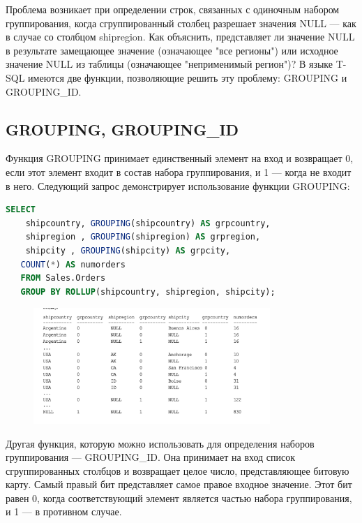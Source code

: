 Проблема возникает при определении строк,
связанных с одиночным набором группирования, когда сгруппированный столбец
разрешает значения NULL — как в случае со столбцом shipregion. Как объяснить,
представляет ли значение NULL в результате замещающее значение (означающее
"все регионы") или исходное значение NULL из таблицы (означающее "неприменимый регион")? В языке T-SQL имеются две функции, позволяющие решить эту
проблему: GROUPING и GROUPING\_ID. 

\subsection{GROUPING, GROUPING\_ID}

Функция GROUPING принимает единственный элемент на вход и возвращает 0, если
этот элемент входит в состав набора группирования, и 1 — когда не входит в него.
Следующий запрос демонстрирует использование функции GROUPING: 

\begin{lstlisting}[label=lst:funcReturn, language=sql]
	SELECT
	shipcountry, GROUPING(shipcountry) AS grpcountry,
	shipregion , GROUPING(shipregion) AS grpregion,
	shipcity , GROUPING(shipcity) AS grpcity,
   COUNT(*) AS numorders
   FROM Sales.Orders
   GROUP BY ROLLUP(shipcountry, shipregion, shipcity); 
\end{lstlisting}

\begin{figure}[h!]
	\begin{center}
		\includegraphics[width=0.8\textwidth]{img/res13.png}
	\end{center}
	\captionsetup{justification=centering}
\end{figure}	


Другая функция, которую можно использовать для определения наборов группирования — GROUPING\_ID. Она принимает на вход список сгруппированных столбцов и
возвращает целое число, представляющее битовую карту. Самый правый бит представляет самое правое входное значение. Этот бит равен 0, когда соответствующий
элемент является частью набора группирования, и 1 — в противном случае.


